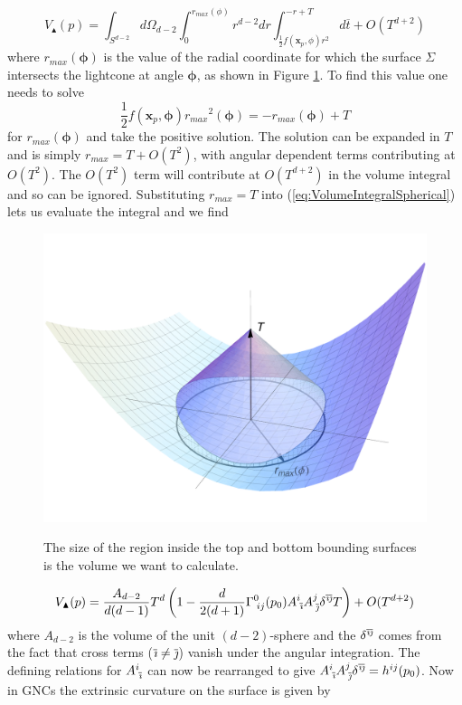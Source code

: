 \documentclass[12pt]{article}
\newcommand{\be}{\begin{equation}}
\newcommand{\ee}{\end{equation}}
\newcommand{\ibar}{{\overline{\emph\i}}}
\newcommand{\jbar}{{\overline{\emph\j}}}
\begin{document}
\be\label{eq:VolumeIntegralSpherical}
V_\blacktriangle(p)=\int_{S^{d-2}}
d\Omega_{d-2}
\int_{0}^{r_{max}(\phi)}r^{d-2}dr
\int_{\frac{1}{2}f(\mathbf{x}_p,\phi)r^2}^{-r+T}
d\overline{t}+O(T^{d+2})
\ee
where $r_{max}(\boldsymbol\phi)$ is the value of the radial coordinate for which the surface $\Sigma$ intersects the lightcone at angle $\boldsymbol\phi$, as shown in Figure \ref{fig:cone_plot}. To find this value one needs to solve 
\be
\frac{1}{2}f(\mathbf{x}_p,\boldsymbol\phi){r_{max}}^2(\boldsymbol\phi)=-r_{max}(\boldsymbol\phi)+T
\ee 
for $r_{max}(\boldsymbol\phi)$ and take the positive solution. The solution can be expanded in $T$ and is simply $r_{max}=T+O(T^2)$, with angular dependent terms contributing at $O(T^2)$. The $O(T^2)$ term will contribute at $O(T^{d+2})$ in the volume integral and so can be ignored. Substituting $r_{max}=T$ into (\ref{eq:VolumeIntegralSpherical}) lets us evaluate the integral and we find 
\begin{figure}[t]
  \centering
{\includegraphics[scale=0.5]{coneplot}}
     \caption{The size of the region inside the top and bottom bounding surfaces is the volume we want to calculate.}
     \label{fig:cone_plot}
\end{figure}
\be\label{eq:VolumeNoK}
V_\blacktriangle(p)
=\frac{A_{d-2}}{d(d-1)}T^d\left(1-\frac{d}{2(d+1)}\Gamma^{0}_{\;ij}(p_0)A^{i}_{\;\ibar}A^{j}_{\;\jbar}\delta^{\ibar\jbar}T\right)
+O(T^{d+2})
\ee
where $A_{d-2}$ is the volume of the unit $(d-2)$-sphere and the $\delta^{\ibar\jbar}$ comes from the fact that cross terms ($\ibar\neq \jbar$) vanish under the angular integration. The defining relations for $A^{i}_{\;\ibar}$ can now be rearranged to give $A^{i}_{\;\ibar}A^{j}_{\;\jbar}\delta^{\ibar\jbar}=h^{ij}(p_0)$. Now in GNCs the extrinsic curvature on the surface is given by
\end{document}
